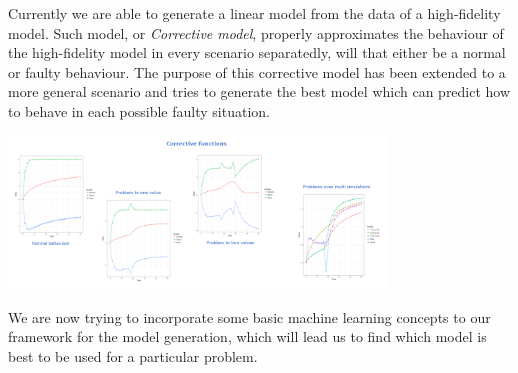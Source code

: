 \documentclass[a0paper]{tikzposter}
\begin{document}
	{
		Currently we are able to generate a linear model from the data of a
		high-fidelity model.
		Such model, or \emph{Corrective model}, properly approximates the
		behaviour of the high-fidelity model in every scenario separatedly, will
		that either be a normal or faulty behaviour.  
		The purpose of this corrective model has been extended to a more general
		scenario and tries to generate the best model which can predict how to
		behave in each possible faulty situation.

		\begin{center}
			\includegraphics[width=0.75\textwidth]{./Images/Corrective_functions.png}
		\end{center}
	}

	{
		We are now trying to incorporate some basic machine learning concepts to
		our framework for the model generation, which will lead us to find which
		model is best to be used for a particular problem.
	}
\end{document}
